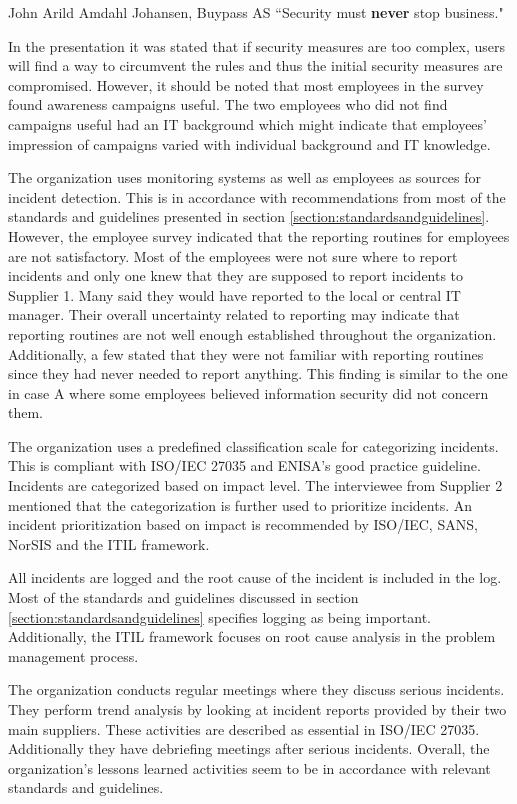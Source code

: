 \begin{newquote}{John Arild Amdahl Johansen, Buypass AS}
``Security must \textbf{never} stop business."
\end{newquote}

In the presentation it was stated that if security measures are too complex, users will find a way to circumvent the rules and thus the initial security measures are compromised. However, it should be noted that most employees in the survey found awareness campaigns useful. The two employees who did not find campaigns useful had an IT background which might indicate that employees' impression of campaigns varied with individual background and IT knowledge. 

The organization uses monitoring systems as well as employees as sources for incident detection. This is in accordance with recommendations from most of the standards and guidelines presented in section \ref{section:standardsandguidelines}. However, the employee survey indicated that the reporting routines for employees are not satisfactory. Most of the employees were not sure where to report incidents and only one knew that they are supposed to report incidents to Supplier 1. Many said they would have reported to the local or central IT manager. Their overall uncertainty related to reporting may indicate that reporting routines are not well enough established throughout the organization. Additionally, a few stated that they were not familiar with reporting routines since they had never needed to report anything. This finding is similar to the one in case A where some employees believed information security did not concern them. 

The organization uses a predefined classification scale for categorizing incidents. This is compliant with ISO/IEC 27035 and ENISA's good practice guideline. Incidents are categorized based on impact level. The interviewee from Supplier 2 mentioned that the categorization is further used to prioritize incidents. An incident prioritization based on impact is recommended by ISO/IEC, SANS, NorSIS and the ITIL framework.

All incidents are logged and the root cause of the incident is included in the log. Most of the standards and guidelines discussed in section \ref{section:standardsandguidelines} specifies logging as being important. Additionally, the ITIL framework focuses on root cause analysis in the problem management process.

The organization conducts regular meetings where they discuss serious incidents. They perform trend analysis by looking at incident reports provided by their two main suppliers. These activities are described as essential in ISO/IEC 27035. Additionally they have debriefing meetings after serious incidents. Overall, the organization's lessons learned activities seem to be in accordance with relevant standards and guidelines.

